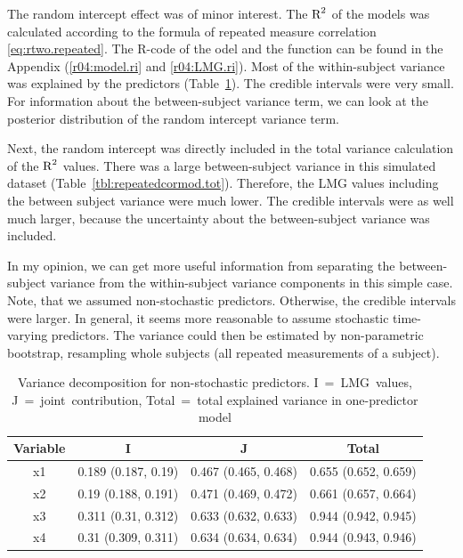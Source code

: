 \documentclass[11pt,a4paper,twoside]{book}
\begin{document}
 The random intercept effect was of minor interest. The $\text{R}^2$ of the models was calculated according to the formula of repeated measure correlation \eqref{eq:rtwo.repeated}. The R-code of the odel and the function can be found in the Appendix (\ref{r04:model.ri} and \ref{r04:LMG.ri}). Most of the within-subject variance was explained by the predictors (Table~\ref{tbl:repeatedcormod}). The credible intervals were very small. For information about the between-subject variance term, we can look at the posterior distribution of the random intercept variance term.

Next, the random intercept was directly included in the total variance calculation of the $\text{R}^2$ values. There was a large between-subject variance in this simulated dataset (Table~\ref{tbl:repeatedcormod.tot}). Therefore, the LMG values including the between subject variance were much lower. The credible intervals were as well much larger, because the uncertainty about the between-subject variance was included. 

In my opinion, we can get more useful information from separating the between-subject variance from the within-subject variance components in this simple case. Note, that we assumed non-stochastic predictors. Otherwise, the credible intervals were larger. In general, it seems more reasonable to assume stochastic time-varying predictors. The variance could then be estimated by non-parametric bootstrap, resampling whole subjects (all repeated measurements of a subject).







\begin{table}[h]
\caption{Variance decomposition for non-stochastic predictors. I~=~LMG~values, J~=~joint~contribution, Total~=~total explained variance in one-predictor model}
\centering
\begin{tabular}{clll}
  \toprule
  \multicolumn{1}{c}{\textbf{Variable}} & \multicolumn{1}{c}{\textbf{I}} &\multicolumn{1}{c}{\textbf{J}} & \multicolumn{1}{c}{\textbf{Total}} \\
  \hline
x1 & 0.189 (0.187, 0.19)  & 0.467 (0.465, 0.468)   & 0.655 (0.652, 0.659)  \\ 
x2 & 0.19 (0.188, 0.191)  & 0.471 (0.469, 0.472)   & 0.661 (0.657, 0.664)  \\ 
x3 & 0.311 (0.31, 0.312)  & 0.633 (0.632, 0.633)   & 0.944 (0.942, 0.945)  \\ 
x4 & 0.31 (0.309, 0.311)  & 0.634 (0.634, 0.634)   & 0.944 (0.943, 0.946)  \\ 
   \bottomrule
\end{tabular}
\label{tbl:repeatedcormod}
\end{table}
\end{document}
